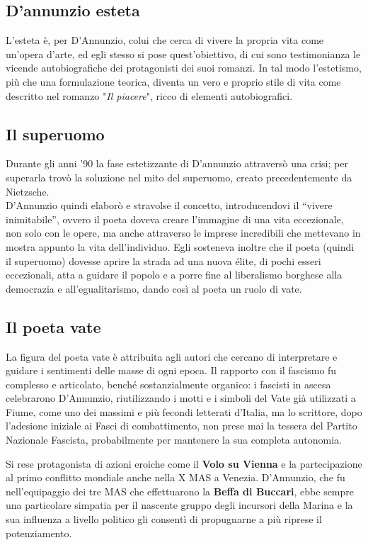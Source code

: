 \documentclass[10pt]{report}
\begin{document}
			\subsection[Esteta]{D'annunzio esteta}
			L'esteta è, per D'Annunzio, colui che cerca di vivere la propria vita come un'opera d'arte, ed egli stesso si pose quest'obiettivo, di cui sono testimonianza le vicende autobiografiche dei protagonisti dei suoi romanzi. In tal modo l'estetismo, più che una formulazione teorica, diventa un vero e proprio stile di vita come descritto nel romanzo "\textit{Il piacere}", ricco di elementi autobiografici.
			\subsection[Superuomo]{Il superuomo}
			Durante gli anni ’90 la fase estetizzante di D’annunzio attraversò una crisi; per superarla trovò la soluzione nel mito del superuomo, creato precedentemente da Nietzsche.\\
			 D’Annunzio quindi elaborò e stravolse il concetto, introducendovi il “vivere inimitabile”, ovvero il poeta doveva creare l’immagine di una vita eccezionale, non solo con le opere, ma anche attraverso le imprese incredibili che mettevano in mostra appunto la vita dell’individuo. Egli sosteneva inoltre che il poeta (quindi il superuomo) dovesse aprire la strada ad una nuova élite, di pochi esseri eccezionali, atta a guidare il popolo e a porre fine al liberalismo borghese alla democrazia e all’egualitarismo, dando così al poeta un ruolo di vate.
			
			
			\subsection[Vate]{Il poeta vate}
			La figura del poeta vate è attribuita agli autori che cercano di interpretare e guidare i sentimenti delle masse di ogni epoca.
			Il rapporto con il fascismo fu complesso e articolato, benché sostanzialmente organico: i fascisti in ascesa celebrarono D'Annunzio, riutilizzando i motti e i simboli del Vate già utilizzati a Fiume, come uno dei massimi e più fecondi letterati d'Italia, ma lo scrittore, dopo l'adesione iniziale ai Fasci di combattimento, non prese mai la tessera del Partito Nazionale Fascista, probabilmente per mantenere la sua completa autonomia.
			
			Si rese protagonista di azioni eroiche come il \textbf{Volo su Vienna} e la partecipazione al primo conflitto mondiale anche nella X MAS a Venezia. 
			D'Annunzio, che fu nell'equipaggio dei tre MAS che effettuarono la \textbf{Beffa di Buccari}, ebbe sempre una particolare simpatia per il nascente gruppo degli incursori della Marina e la sua influenza a livello politico gli consentì di propugnarne a più riprese il potenziamento.
			
\end{document}
